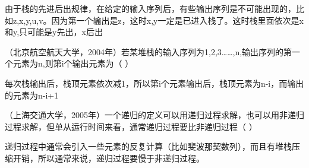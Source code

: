 \begin{solution}由于栈的先进后出规律，在给定的输入序列后，有些输出序列是不可能出现的，比如z,x,y,u,v。因为第一个输出是z，这时x,y一定是已进入栈了。这时栈里面依次是x和y,只可能是y先出，x后出
\end{solution}
\question （北京航空航天大学，2004年）若某堆栈的输入序列为1,2,3\ldots{}\ldots{},n,输出序列的第一个元素为n,则第i个输出元素为（
）
\par{}
\begin{solution}每次栈输出后，栈顶元素依次减1，所以第i个元素输出后，栈顶元素为n-i，而输出的元素为n-i+1
\end{solution}
\question （上海交通大学，2005年）一个递归的定义可以用递归过程求解，也可以用非递归过程求解，但单从运行时间来看，通常递归过程要比非递归过程（
）
\par{}
\begin{solution}递归过程中通常会引入一些元素的反复计算（比如斐波那契数列），而且有堆栈压缩开销，所以通常来说，递归过程要慢于非递归过程。
\end{solution}
